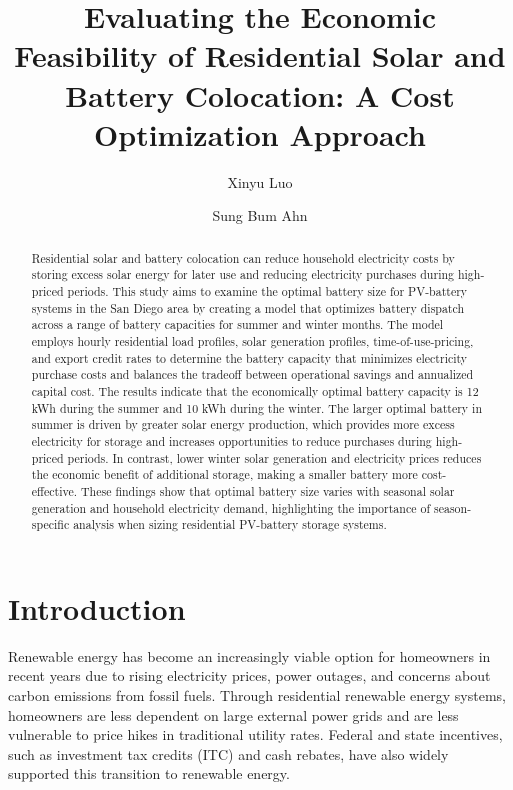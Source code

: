 \documentclass[14pt, final,numbered]{ifacconf}
\begin{document}
\begin{frontmatter}

\title{Evaluating the Economic Feasibility of Residential Solar and Battery Colocation: A Cost Optimization Approach}


\author{Xinyu Luo}
\address{Institute for Computing in Research}

\author{Sung Bum Ahn}
\address{Electric Reliability Council of Texas, Taylor TX}

\begin{abstract}
Residential solar and battery colocation can reduce household electricity costs by storing excess solar energy for later use and reducing electricity purchases during high-priced periods. This study aims to examine the optimal battery size for PV-battery systems in the San Diego area by creating a model that optimizes battery dispatch across a range of battery capacities for summer and winter months. The model employs hourly residential load profiles, solar generation profiles, time-of-use-pricing, and export credit rates to determine the battery capacity that minimizes electricity purchase costs and balances the tradeoff between operational savings and annualized capital cost. The results indicate that the economically optimal battery capacity is 12 kWh during the summer and 10 kWh during the winter. The larger optimal battery in summer is driven by greater solar energy production, which provides more excess electricity for storage and increases opportunities to reduce purchases during high-priced periods. In contrast, lower winter solar generation and electricity prices reduces the economic benefit of additional storage, making a smaller battery more cost-effective. These findings show that optimal battery size varies with seasonal solar generation and household electricity demand, highlighting the importance of season-specific analysis when sizing residential PV-battery storage systems.
\end{abstract}

\end{frontmatter}
\section{Introduction}
Renewable energy has become an increasingly viable option for homeowners in recent years due to rising electricity prices, power outages, and concerns about carbon emissions from fossil fuels. Through residential renewable energy systems, homeowners are less dependent on large external power grids and are less vulnerable to price hikes in traditional utility rates. Federal and state incentives, such as investment tax credits (ITC) and cash rebates, have also widely supported this transition to renewable energy. 
\end{document}
